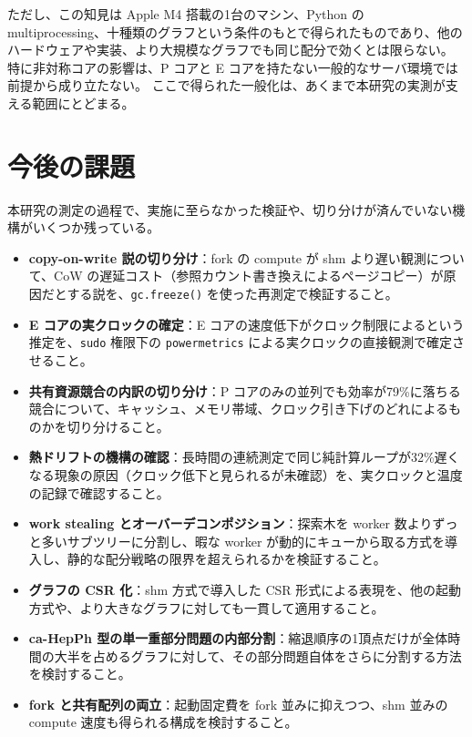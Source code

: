 ただし、この知見は Apple M4 搭載の1台のマシン、Python の multiprocessing、十種類のグラフという条件のもとで得られたものであり、他のハードウェアや実装、より大規模なグラフでも同じ配分で効くとは限らない。
特に非対称コアの影響は、P コアと E コアを持たない一般的なサーバ環境では前提から成り立たない。
ここで得られた一般化は、あくまで本研究の実測が支える範囲にとどまる。

\section{今後の課題}

本研究の測定の過程で、実施に至らなかった検証や、切り分けが済んでいない機構がいくつか残っている。

\begin{itemize}
  \item \textbf{copy-on-write 説の切り分け}：fork の compute が shm より遅い観測について、CoW の遅延コスト（参照カウント書き換えによるページコピー）が原因だとする説を、\texttt{gc.freeze()} を使った再測定で検証すること。
  \item \textbf{E コアの実クロックの確定}：E コアの速度低下がクロック制限によるという推定を、\texttt{sudo} 権限下の \texttt{powermetrics} による実クロックの直接観測で確定させること。
  \item \textbf{共有資源競合の内訳の切り分け}：P コアのみの並列でも効率が79\%に落ちる競合について、キャッシュ、メモリ帯域、クロック引き下げのどれによるものかを切り分けること。
  \item \textbf{熱ドリフトの機構の確認}：長時間の連続測定で同じ純計算ループが32\%遅くなる現象の原因（クロック低下と見られるが未確認）を、実クロックと温度の記録で確認すること。
  \item \textbf{work stealing とオーバーデコンポジション}：探索木を worker 数よりずっと多いサブツリーに分割し、暇な worker が動的にキューから取る方式を導入し、静的な配分戦略の限界を超えられるかを検証すること。
  \item \textbf{グラフの CSR 化}：shm 方式で導入した CSR 形式による表現を、他の起動方式や、より大きなグラフに対しても一貫して適用すること。
  \item \textbf{ca-HepPh 型の単一重部分問題の内部分割}：縮退順序の1頂点だけが全体時間の大半を占めるグラフに対して、その部分問題自体をさらに分割する方法を検討すること。
  \item \textbf{fork と共有配列の両立}：起動固定費を fork 並みに抑えつつ、shm 並みの compute 速度も得られる構成を検討すること。
\end{itemize}
